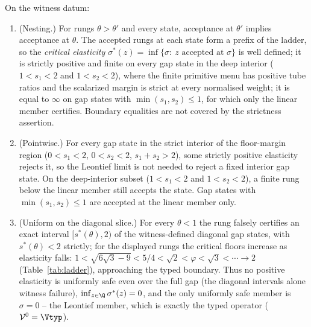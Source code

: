 \begin{theorem}\label{thm:ladder}
On the witness datum:
\begin{enumerate}[label=\textup{(\roman*)},leftmargin=2em]
\item \textup{(Nesting.)} For rungs $\theta>\theta'$ and every state, acceptance at $\theta'$ implies acceptance at $\theta$. The accepted rungs at each state form a prefix of the ladder, so the \emph{critical elasticity} $\sigma^*(z)=\inf\{\sigma:\ z\text{ accepted at }\sigma\}$ is well defined; it is strictly positive and finite on every gap state in the deep interior ($1<s_1<2$ and $1<s_2<2$), where the finite primitive menu has positive tube ratios and the scalarized margin is strict at every normalised weight; it is equal to $\infty$ on gap states with $\min(s_1,s_2)\le1$, for which only the linear member certifies. Boundary equalities are not covered by the strictness assertion.
\item \textup{(Pointwise.)} For every gap state in the strict interior of the floor-margin region ($0<s_1<2$, $0<s_2<2$, $s_1+s_2>2$), some strictly positive elasticity rejects it, so the Leontief limit is not needed to reject a fixed interior gap state. On the deep-interior subset ($1<s_1<2$ and $1<s_2<2$), a finite rung below the linear member still accepts the state. Gap states with $\min(s_1,s_2)\le1$ are accepted at the linear member only.
\item \textup{(Uniform on the diagonal slice.)} For every $\theta<1$ the rung falsely certifies an exact interval $[s^*(\theta),2)$ of the witness-defined diagonal gap states, with $s^*(\theta)<2$ strictly; for the displayed rungs the critical floors increase as elasticity falls: $1<\sqrt{6\sqrt3-9}<5/4<\sqrt2<\varphi<\sqrt3<\cdots\to2$ (Table~\ref{tab:ladder}), approaching the typed boundary. Thus no positive elasticity is uniformly safe even over the full gap (the diagonal intervals alone witness failure), $\inf_{z\in\Q}\sigma^*(z)=0$, and the only uniformly safe member is $\sigma=0$ -- the Leontief member, which is exactly the typed operator ($\mathcal V^{0}=\Vtyp$).
\end{enumerate}
\end{theorem}

